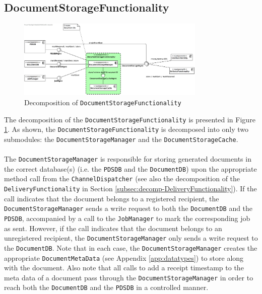 \documentclass[a4paper,10pt]{article}
\begin{document}
\subsection{DocumentStorageFunctionality}\label{subsec:decomp-DocumentStorageFunctionality}
\begin{figure}[!htp]
	\centering
	\includegraphics[width=0.8\textwidth]{DocumentStorageFunctionality.png}
	\caption{Decomposition of \texttt{DocumentStorageFunctionality}}
	\label{fig:decomp-DocumentStorageFunctionality}
\end{figure}
\FloatBarrier
\noindent
The decomposition of the \texttt{DocumentStorageFunctionality} is presented in Figure \ref{fig:decomp-DocumentStorageFunctionality}. As shown, the \texttt{DocumentStorageFunctionality} is decomposed into only two submodules: the \texttt{DocumentStorageManager} and the \texttt{DocumentStorageCache}.\\\\
The \texttt{DocumentStorageManager} is responsible for storing generated documents in the correct database(s) (i.e. the \texttt{PDSDB} and the \texttt{DocumentDB}) upon the appropriate method call from the \texttt{ChannelDispatcher} (see also the decomposition of the \texttt{DeliveryFunctionality} in Section \ref{subsec:decomp-DeliveryFunctionality}). If the call indicates that the document belongs to a registered recipient, the \texttt{DocumentStorageManager} sends a write request to both the \texttt{DocumentDB} and the \texttt{PDSDB}, accompanied by a call to the \texttt{JobManager} to mark the corresponding job as sent. However, if the call indicates that the document belongs to an unregistered recipient, the \texttt{DocumentStorageManager} only sends a write request to the \texttt{DocumentDB}. Note that in each case, the \texttt{DocumentStorageManager} creates the appropriate \texttt{DocumentMetaData} (see Appendix \ref{app:datatypes}) to store along with the document. Also note that all calls to add a receipt timestamp to the meta data of a document pass through the \texttt{DocumentStorageManager} in order to reach both the \texttt{DocumentDB} and the \texttt{PDSDB} in a controlled manner.\\\\
\end{document}
